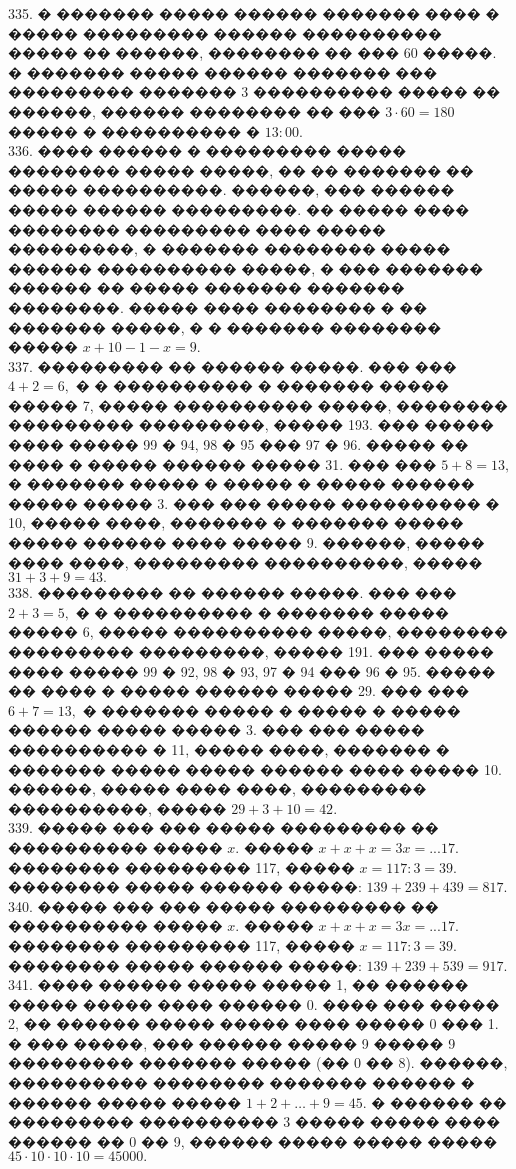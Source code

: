 \documentclass[12pt]{article}
\begin{document}
335. � ������� ����� ������ ������� ���� � ����� ��������� ������ ���������� ����� �� ������, �������� �� ��� 60 �����. � ������� ����� ������ ������� ��� ��������� ������� 3 ���������� ����� �� ������, ������ �������� �� ��� $3\cdot60=180$ ����� � ���������� � $13:00.$\\
336. ���� ������ � ��������� ����� �������� ����� �����, �� �� ������� �� ����� ����������. ������, ��� ������ ����� ������ ���������. �� ����� ���� �������� ��������� ���� ����� ���������, � ������� �������� ����� ������ ���������� �����, � ��� ������� ������ �� ����� ������� ������� ��������. ����� ���� �������� � �� ������� �����, � � ������� �������� ����� $x+10-1-x=9.$\\
337. ��������� �� ������ �����. ��� ��� $4+2=6,$ � � ���������� � ������� ����� ����� 7, ����� ���������� �����, �������� ��������� ���������, ����� 193. ��� ����� ���� ����� 99 � 94, 98 � 95 ��� 97 � 96. ����� �� ���� � ����� ������ ����� 31. ��� ��� $5+8=13,$ � ������� ����� � ����� � ����� ������ ����� ����� 3. ��� ��� ����� ���������� � 10, ����� ����, ������� � ������� ����� ����� ������ ���� ����� 9. ������, ����� ���� ����, ��������� ����������, ����� $31+3+9=43.$\\
338. ��������� �� ������ �����. ��� ��� $2+3=5,$ � � ���������� � ������� ����� ����� 6, ����� ���������� �����, �������� ��������� ���������, ����� 191. ��� ����� ���� ����� 99 � 92, 98 � 93, 97 � 94 ��� 96 � 95. ����� �� ���� � ����� ������ ����� 29. ��� ��� $6+7=13,$ � ������� ����� � ����� � ����� ������ ����� ����� 3. ��� ��� ����� ���������� � 11, ����� ����, ������� � ������� ����� ����� ������ ���� ����� 10. ������, ����� ���� ����, ��������� ����������, ����� $29+3+10=42.$\\
339. ����� ��� ��� ����� ��������� �� ���������� ����� $x.$ ����� $x+x+x=3x=...17.$ �������� ��������� 117, ����� $x=117:3=39.$ �������� ����� ������ �����: $139+239+439=817.$\\
340. ����� ��� ��� ����� ��������� �� ���������� ����� $x.$ ����� $x+x+x=3x=...17.$ �������� ��������� 117, ����� $x=117:3=39.$ �������� ����� ������ �����: $139+239+539=917.$\\
341. ���� ������ ����� ����� 1, �� ������ ����� ����� ���� ������ 0. ���� ��� ����� 2, �� ������ ����� ����� ���� ����� 0 ��� 1. � ��� �����, ��� ������ ����� 9 ����� 9 ��������� ������� ����� (�� 0 �� 8). ������, ���������� �������� ������� ������ � ������ ����� ����� $1+2+\ldots+9=45.$ � ������ �� ��������� ���������� 3 ����� ����� ���� ������ �� 0 �� 9, ������ ����� ����� ����� $45\cdot10\cdot10\cdot10=45000.$\\
\end{document}
